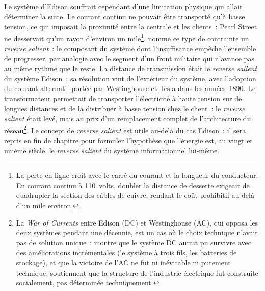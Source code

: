 %
Le système d'Edison souffrait cependant d'une limitation physique qui allait déterminer la suite. Le courant continu ne pouvait être transporté qu'à basse tension, ce qui imposait la proximité entre la centrale et les clients~: Pearl Street ne desservait qu'un rayon d'environ un mile\footnote{La perte en ligne croît avec le carré du courant et la longueur du conducteur. En courant continu à 110~volts, doubler la distance de desserte exigeait de quadrupler la section des câbles de cuivre, rendant le coût prohibitif au-delà d'un mile environ.}. \textcite{hughes_networks_1983} nomme ce type de contrainte un \emph{reverse salient}~: le composant du système dont l'insuffisance empêche l'ensemble de progresser, par analogie avec le segment d'un front militaire qui n'avance pas au même rythme que le reste. La distance de transmission était le \emph{reverse salient} du système Edison~; sa résolution vint de l'extérieur du système, avec l'adoption du courant alternatif portée par Westinghouse et Tesla dans les années~1890. Le transformateur permettait de transporter l'électricité à haute tension sur de longues distances et de la distribuer à basse tension chez le client~: le \emph{reverse salient} était levé, mais au prix d'un remplacement complet de l'architecture du réseau\footnote{La \emph{War of Currents} entre Edison (DC) et Westinghouse (AC), qui opposa les deux systèmes pendant une décennie, est un cas où le choix technique n'avait pas de solution unique~: \textcite{hughes_networks_1983} montre que le système DC aurait pu survivre avec des améliorations incrémentales (le système à trois fils, les batteries de stockage), et que la victoire de l'AC ne fut ni inévitable ni purement technique. \textcite{granovetter_making_1998} soutiennent que la structure de l'industrie électrique fut construite socialement, pas déterminée techniquement.}. Le concept de \emph{reverse salient} est utile au-delà du cas Edison~: il sera repris en fin de chapitre pour formuler l'hypothèse que l'énergie est, au vingt et unième siècle, le \emph{reverse salient} du système informationnel lui-même.

